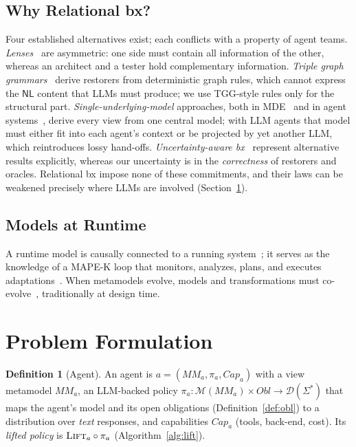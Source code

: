 \documentclass[10pt, anonymous, conference]{IEEEtran}
\theoremstyle{definition}
\newtheorem{definition}{Definition}[section]
\theoremstyle{plain}
\theoremstyle{remark}
\newcommand{\MM}{\mathit{MM}}
\newcommand{\Mods}[1]{\mathcal{M}(#1)}
\newcommand{\NL}{\mathsf{NL}}
\newcommand{\Dist}[1]{\mathcal{D}(#1)}
\begin{document}
\subsection{Why Relational bx?} \label{subsec:why}
Four established alternatives exist; each conflicts with a property of agent
teams.
\emph{Lenses}~\cite{foster2007lenses} are asymmetric: one side must contain all
information of the other, whereas an architect and a tester hold
complementary information.
\emph{Triple graph grammars}~\cite{schurr1994tgg} derive restorers from
deterministic graph rules, which cannot express the $\NL$ content that LLMs
must produce; we use TGG-style rules only for the structural part.
\emph{Single-underlying-model} approaches, both in MDE~\cite{klare2021vitruvius}
and in agent systems~\cite{zhang2026patchboard}, derive every view from one
central model; with LLM agents that model must either fit into each agent's
context or be projected by yet another LLM, which reintroduces lossy hand-offs.
\emph{Uncertainty-aware bx}~\cite{eramo2015uncertainty} represent
alternative results explicitly, whereas our uncertainty is in the
\emph{correctness} of restorers and oracles.
Relational bx impose none of these commitments, and their laws can be weakened
precisely where LLMs are involved (Section~\ref{sec:problem}).

\subsection{Models at Runtime} \label{subsec:runtime}
A runtime model is causally connected to a running
system~\cite{blair2009runtime}; it serves as the knowledge of a MAPE-K loop
that monitors, analyzes, plans, and executes
adaptations~\cite{kephart2003autonomic,weyns2020sas}. When metamodels evolve,
models and transformations must co-evolve~\cite{hebig2017coevolution},
traditionally at design time.



\section{Problem Formulation}\label{sec:problem}

\begin{definition}[Agent]\label{def:agent}
An agent is $a=(\MM_a,\pi_a,\mathit{Cap}_a)$ with a view metamodel $\MM_a$, an
LLM-backed policy $\pi_a\colon\Mods{\MM_a}\times\mathit{Obl}\to\Dist{\Sigma^*}$
that maps the agent's model and its open obligations
(Definition~\ref{def:obl}) to a distribution over \emph{text} responses, and
capabilities $\mathit{Cap}_a$ (tools, back-end, cost). Its \emph{lifted
policy} is $\textsc{Lift}_a\circ\pi_a$ (Algorithm~\ref{alg:lift}).
\end{definition}
\end{document}

